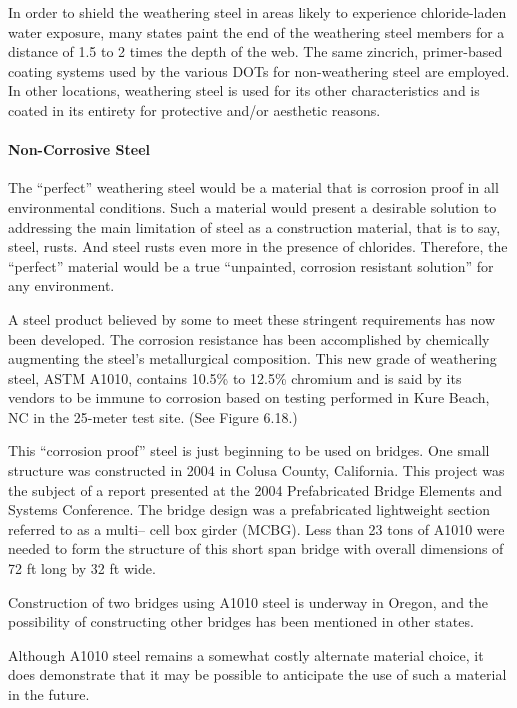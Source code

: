 In order to shield the weathering steel in areas likely to experience chloride-laden water exposure, many states
paint the end of the weathering steel members for a distance of 1.5 to 2 times the depth of the web. The same zincrich,
primer-based coating systems used by the various DOTs for non-weathering steel are employed. In other locations, weathering steel is used for its other characteristics and is coated in its entirety for protective and/or
aesthetic reasons.

\paragraph{Non-Corrosive Steel}
The “perfect” weathering steel would be a material that is corrosion proof in all environmental conditions. Such a
material would present a desirable solution to addressing the main limitation of steel as a construction material, that
is to say, steel, rusts. And steel rusts even more in the presence of chlorides. Therefore, the “perfect” material would
be a true “unpainted, corrosion resistant solution” for any environment.

A steel product believed by some to meet these stringent requirements has now been developed. The corrosion
resistance has been accomplished by chemically augmenting the steel’s metallurgical composition. This new grade of
weathering steel, ASTM A1010, contains 10.5\% to 12.5\% chromium and is said by its vendors to be immune to
corrosion based on testing performed in Kure Beach, NC in the 25-meter test site. (See Figure 6.18.)

This “corrosion proof” steel is just beginning to be used on bridges. One small structure was constructed in 2004
in Colusa County, California. This project was the subject of a report presented at the 2004 Prefabricated Bridge
Elements and Systems Conference. The bridge design was a prefabricated lightweight section referred to as a multi--
cell box girder (MCBG). Less than 23 tons of A1010 were needed to form the structure of this short span bridge
with overall dimensions of 72 ft long by 32 ft wide.

Construction of two bridges using A1010 steel is underway in Oregon, and the possibility of constructing other
bridges has been mentioned in other states.

Although A1010 steel remains a somewhat costly alternate material choice, it does demonstrate that it may be
possible to anticipate the use of such a material in the future.

